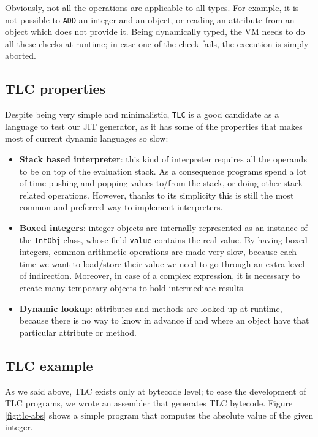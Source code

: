 Obviously, not all the operations are applicable to all types. For example,
it is not possible to \lstinline{ADD} an integer and an object, or reading an
attribute from an object which does not provide it.  Being dynamically typed,
the VM needs to do all these checks at runtime; in case one of the check
fails, the execution is simply aborted.

\subsection{TLC properties}
\label{sec:tlc-properties}

Despite being very simple and minimalistic, \lstinline{TLC} is a good
candidate as a language to test our JIT generator, as it has some of the
properties that makes most of current dynamic languages so slow:

\begin{itemize}

\item \textbf{Stack based interpreter}: this kind of interpreter requires all the operands to be
  on top of the evaluation stack.  As a consequence programs spend a lot of
  time pushing and popping values to/from the stack, or doing other stack
  related operations.  However, thanks to its simplicity this is still the
  most common and preferred way to implement interpreters.

\item \textbf{Boxed integers}: integer objects are internally represented as
  an instance of the \lstinline{IntObj} class, whose field \lstinline{value}
  contains the real value.  By having boxed integers, common arithmetic
  operations are made very slow, because each time we want to load/store their
  value we need to go through an extra level of indirection.  Moreover, in
  case of a complex expression, it is necessary to create many temporary
  objects to hold intermediate results.

\item \textbf{Dynamic lookup}: attributes and methods are looked up at
  runtime, because there is no way to know in advance if and where an object
  have that particular attribute or method.
\end{itemize}


\subsection{TLC example}

As we said above, TLC exists only at bytecode level; to ease the development
of TLC programs, we wrote an assembler that generates TLC bytecode. Figure \ref{fig:tlc-abs}
shows a simple program that computes the absolute value of
the given integer.

